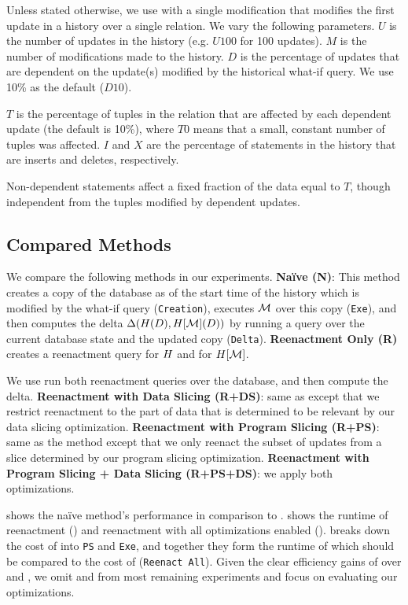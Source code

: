 
Unless stated otherwise, we use \abbrHWs with a single modification that modifies the first update in a history over a single relation.
We vary the following parameters. $U$ is the number of updates in the history (e.g. $U100$ for 100 updates). 
$M$ is the number of modifications made to the history.
$D$ is the percentage of updates that are dependent on the update(s) modified by the historical what-if query. We use 10\% as the default  ($D10$).

$T$ is the percentage of tuples in the relation that are affected by each dependent update (the default is 10\%), where $T0$ means that a small, constant number of tuples was affected. $I$ and $X$ are the percentage of statements in the history that are inserts and deletes, respectively.

Non-dependent statements affect a fixed fraction of the data equal to $T$, though independent from the tuples modified by dependent updates. 


\subsection{Compared Methods}
We compare the following methods in our experiments.
\textbf{Naïve (N)}: This method creates a copy of the database as of the start time of the history which is modified by the what-if query (\texttt{Creation}), executes $\mathcal{M}$ over this copy (\texttt{Exe}), and then computes the delta $\Delta(H(D),H[\mathcal{M}](D))$ by running a query over the current database state and the updated copy (\texttt{Delta}).
\textbf{Reenactment Only (R)} creates a reenactment query for $H$ and for $H[\mathcal{M}]$.

We use run both reenactment queries over the database, and then compute the delta. \textbf{Reenactment with Data Slicing (R+DS)}: same as \mr except that we restrict reenactment to the part of data that is determined to be relevant  by our data slicing optimization. \textbf{Reenactment with Program Slicing (R+PS)}: same as the \mr method except that we only reenact the subset of updates from a slice determined by our program slicing optimization. \textbf{Reenactment with Program Slicing + Data Slicing (R+PS+DS)}:  we apply both optimizations.

 shows the naïve method's performance in comparison to \mrdp.  shows the runtime of reenactment (\mr) and reenactment with all optimizations enabled (\mrdp).   breaks down the cost of \mrdp into \texttt{PS} and \texttt{Exe}, and together they form the runtime of \mrdp which should be compared to the cost of \mr (\texttt{Reenact All}). Given the clear efficiency gains of \mrdp over \mn and \mr, we omit \mn and \mr from most remaining experiments and focus on evaluating our optimizations.


